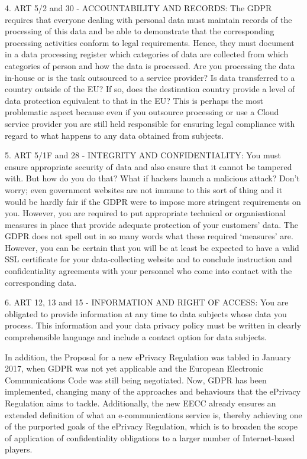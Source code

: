 \documentclass[12pt]{amsart}
\begin{document}
\begin{multicols}{2}
\vspace{0.35cm}
4. ART 5/2
and 30 - ACCOUNTABILITY AND RECORDS: The GDPR requires that everyone
dealing with personal data must maintain records of the processing of
this data and be able to demonstrate that the corresponding processing
activities conform to legal requirements. Hence, they must document in
a data processing register which categories of data are collected from
which categories of person and how the data is processed. Are you
processing the data in-house or is the task outsourced to a service
provider? Is data transferred to a country outside of the EU? If so,
does the destination country provide a level of data protection
equivalent to that in the EU? This is perhaps the most problematic
aspect because even if you outsource processing or use a Cloud service
provider you are still held responsible for ensuring legal compliance
with regard to what happens to any data obtained from subjects.

\vspace{0.35cm}
5. ART 5/1F and 28 - INTEGRITY AND CONFIDENTIALITY: You must ensure
appropriate security of data and also ensure that it cannot be
tampered with. But how do you do that? What if hackers launch a
malicious attack? Don’t worry; even government websites are not immune
to this sort of thing and it would be hardly fair if the GDPR were to
impose more stringent requirements on you. However, you are required
to put appropriate technical or organisational measures in place that
provide adequate protection of your customers’ data. The GDPR does not
spell out in so many words what these required ‘measures’
are. However, you can be certain that you will be at least be expected
to have a valid SSL certificate for your data-collecting website and
to conclude instruction and confidentiality agreements with your
personnel who come into contact with the corresponding data.

\vspace{0.35cm}
6. ART
12, 13 and 15 - INFORMATION AND RIGHT OF ACCESS: You are obligated to
provide information at any time to data subjects whose data you
process. This information and your data privacy policy must be written
in clearly comprehensible language and include a contact option for
data subjects.


\vspace{0.35cm}

In addition, the Proposal for a new ePrivacy
Regulation was tabled in January 2017, when GDPR was not yet
applicable and the European Electronic Communications Code\cite{eecc18}
was still being negotiated. Now, GDPR has been implemented,
changing many of the approaches and behaviours that the ePrivacy
Regulation aims to tackle. Additionally, the new EECC already ensures
an extended definition of what an e-communications service is, thereby
achieving one of the purported goals of the ePrivacy Regulation, which
is to broaden the scope of application of confidentiality obligations
to a larger number of Internet-based players.



\end{multicols}
\end{document}
